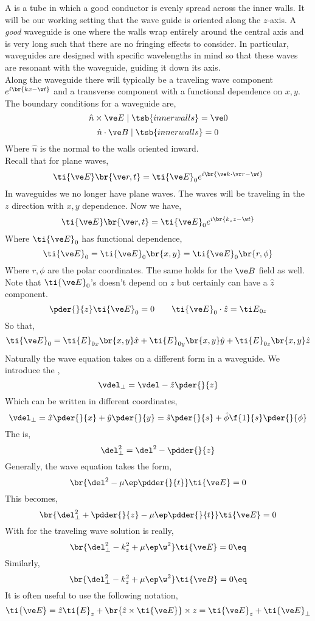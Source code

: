\documentclass{article}
\begin{document}
A  is a tube in which a good conductor is evenly spread across the inner walls. It will be our working setting that the wave guide is oriented along the $z$-axis. A \textit{good} waveguide is one where the walls wrap entirely around the central axis and is very long such that there are no fringing effects to consider. In particular, waveguides are designed with specific wavelengths in mind so that these waves are resonant with the waveguide, guiding it down its axis. \\

Along the waveguide there will typically be a traveling wave component $e^{i\br{kx - \w t}}$ and a transverse component with a functional dependence on $x ,y$. The boundary conditions for a waveguide are,
\[ \hat n \times \ve E \mid\tsb{inner walls} = \ve 0 \]
\[ \hat n \cdot \ve B \mid\tsb{inner walls} = 0 \]
Where $\hat n$ is the normal to the walls oriented inward.\\

Recall that for plane waves,
\[ \ti {\ve E}\br{\ve r, t} = \ti {\ve E}_0 e^{i\br{\ve k \cdot \vr r - \w t}}\]
In waveguides we no longer have plane waves. The waves will be traveling in the $z$ direction with $x,y$ dependence. Now we have,
\[ \ti {\ve E}\br{\ve r, t} = \ti {\ve E}_0 e^{i\br{k_z z - \w t}}\]
Where $\ti {\ve E}_0$ has functional dependence,
\[ \ti {\ve E}_0 = \ti {\ve E}_0\br{x,y} = \ti {\ve E}_0\br{r, \phi} \]
Where $r, \phi$ are the polar coordinates. The same holds for the $\ve B$ field as well. Note that $\ti {\ve E}_0$'s doesn't depend on $z$ but certainly can have a $\hat z$ component.
\[ \pder{}{z}\ti {\ve E}_0 = 0 \qquad \ti {\ve E}_0 \cdot \hat z = {\ti E}_{0z}\]
So that,
\[ \ti {\ve E}_0 = \ti {E}_{0x} \br{x,y} \hat x + \ti {E}_{0y} \br{x,y} \hat y + \ti {E}_{0z} \br{x,y} \hat z \]
Naturally the wave equation takes on a different form in a waveguide. We introduce the ,
\[ \vdel_{\perp} = \vdel - \hat z \pder{}{z} \]
Which can be written in different coordinates,
\[ \vdel_{\perp} = \hat x \pder{}{x} + \hat y \pder{}{y} = \hat s \pder{}{s} + \hat \phi \f{1}{s} \pder{}{\phi} \]
The  is,
\[ \del_{\perp}^2 = \del^2 - \pdder{}{z} \]
Generally, the wave equation takes the form,
\[ \br{\del^2 - \mu \ep \pdder{}{t}} \ti {\ve E} = 0 \]
This becomes,
\[ \br{\del_{\perp}^2 + \pdder{}{z} - \mu \ep \pdder{}{t}} \ti {\ve E} = 0 \]
With for the traveling wave solution is really,
\[ \br{\del_{\perp}^2 - k_z^2 + \mu \ep \w^2} \ti {\ve E} = 0 \eq \label{eq:wave_guide_E}\]
Similarly,
\[ \br{\del_{\perp}^2 - k_z^2 + \mu \ep \w^2} \ti {\ve B} = 0 \eq \label{eq:wave_guide_B}\]
It is often useful to use the following notation,
\[ \ti {\ve E} = \hat z \ti {E}_z + \br{\hat z \times \ti {\ve E}} \times z = \ti {\ve E}_z + \ti {\ve E}_{\perp} \]
\end{document}
